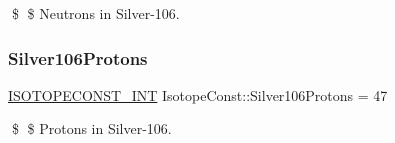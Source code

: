 \$ \$ Neutrons in Silver-\/106. \mbox{\label{group___isotope_const-_silver-_ag106_gae001a542a8c0b66aa5ebc07023591866}} 
\subsubsection{\texorpdfstring{Silver106\+Protons}{Silver106Protons}}
{\footnotesize\ttfamily \mbox{\hyperlink{group___isotope_const-_macros_ga5f18360b3e99483a35c32d789e62621c}{I\+S\+O\+T\+O\+P\+E\+C\+O\+N\+S\+T\+\_\+\+I\+NT}} Isotope\+Const\+::\+Silver106\+Protons = 47}

\$ \$ Protons in Silver-\/106. 